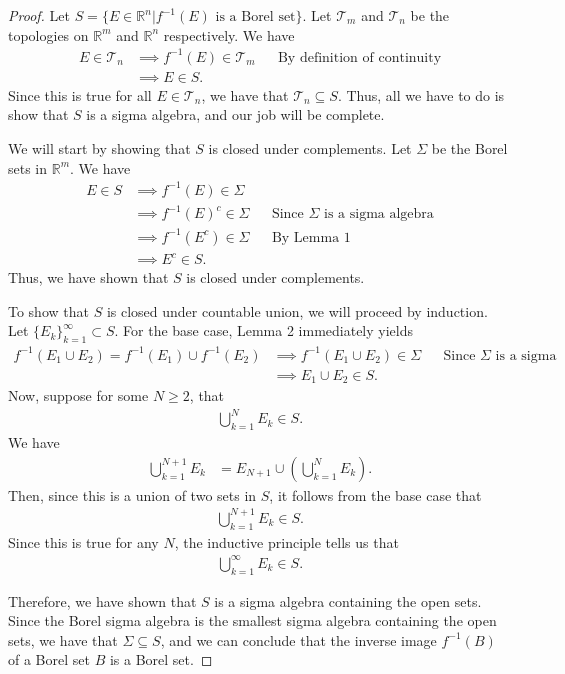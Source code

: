 \documentclass[10pt,a4paper]{article}
\theoremstyle{theorem}
\theoremstyle{definition}
\newcommand{\Tau}{\mathcal{T}}
\begin{document}
\begin{proof}
Let $S = \{E \in \mathbb{R}^n| f^{-1}(E) \text{ is a Borel set} \}$.  Let $\Tau_m$ and $\Tau_n$ be the topologies on $\mathbb{R}^m$ and $\mathbb{R}^n$ respectively. 
We have
\begin{align*}
E \in \Tau_n &\implies f^{-1}(E) \in \Tau_m &&\text{By definition of continuity}\\
&\implies E \in S.
\end{align*}
Since this is true for all $E \in \Tau_n$, we have that $\Tau_n \subseteq S$. Thus, all we have to do is show that $S$ is a sigma algebra, and our job will be complete.

We will start by showing that $S$ is closed under complements. Let $\Sigma$ be the Borel sets in $\mathbb{R}^m$. We have
\begin{align*}
E \in S &\implies f^{-1}(E) \in \Sigma\\
&\implies f^{-1}(E)^c \in \Sigma &&\text{Since } \Sigma \text{ is a sigma algebra}\\
&\implies f^{-1}(E^c) \in \Sigma &&\text{By Lemma 1}\\
&\implies E^c \in S.
\end{align*}
Thus, we have shown that $S$ is closed under complements.

To show that $S$ is closed under countable union, we will proceed by induction. Let $\{E_k\}_{k=1}^\infty \subset S$.  For the base case, Lemma 2 immediately yields
\begin{align*}
f^{-1}(E_1 \cup E_2) = f^{-1}(E_1) \cup f^{-1}(E_2) &\implies f^{-1}(E_1 \cup E_2) \in \Sigma &&\text{Since } \Sigma \text{ is a sigma algebra}\\
&\implies E_1 \cup E_2 \in S.
\end{align*}
Now, suppose for some $N \geq 2$, that 
\begin{align}
\bigcup_{k =1}^N E_k \in S.
\end{align}
We have
\begin{align*}
\bigcup_{k =1}^{N+1} E_k &= E_{N+1} \cup \left( \bigcup_{k =1}^N E_k \right).
\end{align*}
Then, since this is a union of two sets in $S$, it follows from the base case that 
\begin{align*}
\bigcup_{k =1}^{N + 1} E_k \in S.
\end{align*}
Since this is true for any $N$, the inductive principle tells us that 
\begin{align*}
\bigcup_{k =1}^{\infty} E_k \in S.
\end{align*}

Therefore, we have shown that $S$ is a sigma algebra containing the open sets. Since the Borel sigma algebra is the smallest sigma algebra containing the open sets, we have that $\Sigma \subseteq S$, and we can conclude that the inverse image $f^{-1}(B)$ of a Borel set $B$ is a Borel set.
\end{proof}
\end{document}
